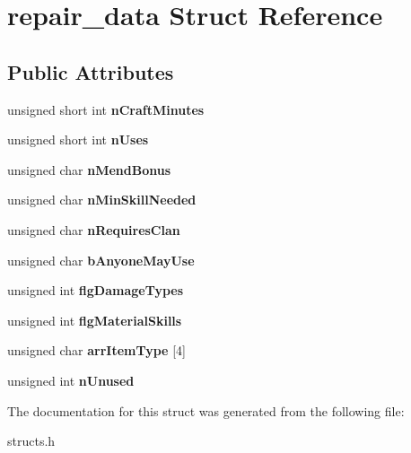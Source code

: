 \hypertarget{structrepair__data}{\section{repair\-\_\-data Struct Reference}
\label{structrepair__data}
}
\subsection*{Public Attributes}
\begin{DoxyCompactItemize}
\item 
\hypertarget{structrepair__data_aaf9cb30501da0fcdd9ec2d3a7f046163}{unsigned short int {\bfseries n\-Craft\-Minutes}}\label{structrepair__data_aaf9cb30501da0fcdd9ec2d3a7f046163}

\item 
\hypertarget{structrepair__data_aeb708e14f1dc18f87b9ad3d8d76af2b1}{unsigned short int {\bfseries n\-Uses}}\label{structrepair__data_aeb708e14f1dc18f87b9ad3d8d76af2b1}

\item 
\hypertarget{structrepair__data_a27d05ca35c7f078dbf88614de0c61b23}{unsigned char {\bfseries n\-Mend\-Bonus}}\label{structrepair__data_a27d05ca35c7f078dbf88614de0c61b23}

\item 
\hypertarget{structrepair__data_ad636f0948e248bda6414c21ae873f7f6}{unsigned char {\bfseries n\-Min\-Skill\-Needed}}\label{structrepair__data_ad636f0948e248bda6414c21ae873f7f6}

\item 
\hypertarget{structrepair__data_ad0cbc9f8bb473c514fc096d350fce8cd}{unsigned char {\bfseries n\-Requires\-Clan}}\label{structrepair__data_ad0cbc9f8bb473c514fc096d350fce8cd}

\item 
\hypertarget{structrepair__data_a6653d42ba1113629231aa0866039a8c1}{unsigned char {\bfseries b\-Anyone\-May\-Use}}\label{structrepair__data_a6653d42ba1113629231aa0866039a8c1}

\item 
\hypertarget{structrepair__data_a848d9f9734398c80549f983f6ed1f12e}{unsigned int {\bfseries flg\-Damage\-Types}}\label{structrepair__data_a848d9f9734398c80549f983f6ed1f12e}

\item 
\hypertarget{structrepair__data_ac2c69e734cf15c23f0596e1163cf9147}{unsigned int {\bfseries flg\-Material\-Skills}}\label{structrepair__data_ac2c69e734cf15c23f0596e1163cf9147}

\item 
\hypertarget{structrepair__data_a0606072cc6581b1d5ca402204c436f88}{unsigned char {\bfseries arr\-Item\-Type} \mbox{[}4\mbox{]}}\label{structrepair__data_a0606072cc6581b1d5ca402204c436f88}

\item 
\hypertarget{structrepair__data_a4529eaf745909e45171be3ba70399528}{unsigned int {\bfseries n\-Unused}}\label{structrepair__data_a4529eaf745909e45171be3ba70399528}

\end{DoxyCompactItemize}


The documentation for this struct was generated from the following file\-:\begin{DoxyCompactItemize}
\item 
structs.\-h\end{DoxyCompactItemize}
